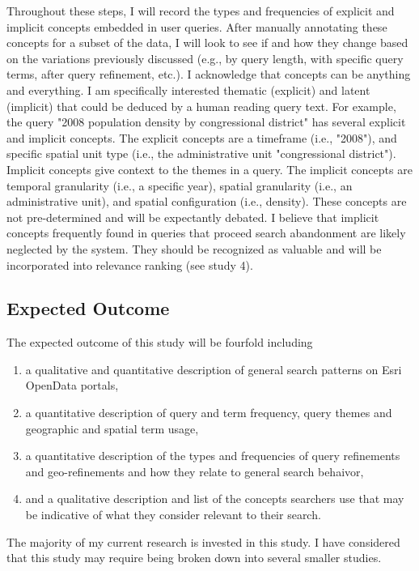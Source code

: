 Throughout these steps, I will record the types and frequencies of explicit and implicit concepts embedded in user queries. After manually annotating these concepts for a subset of the data, I will look to see if and how they change based on the variations previously discussed (e.g., by query length, with specific query terms, after query refinement, etc.). I acknowledge that concepts can be anything and everything. I am specifically interested thematic (explicit) and latent (implicit) that could be deduced by a human reading query text. For example, the query "2008 population density by congressional district" has several explicit and implicit concepts. The explicit concepts are a timeframe (i.e., "2008"), and specific spatial unit type (i.e., the administrative unit "congressional district"). Implicit concepts give context to the themes in a query. The implicit concepts are temporal granularity (i.e., a specific year), spatial granularity (i.e., an administrative unit), and spatial configuration (i.e., density). These concepts are not pre-determined and will be expectantly debated. I believe that implicit concepts frequently found in queries that proceed search abandonment are likely neglected by the system. They should be recognized as valuable and will be incorporated into relevance ranking (see study 4).

\subsection{Expected Outcome}
The expected outcome of this study will be fourfold including 
\begin{enumerate}
    \item a qualitative and quantitative description of general search patterns on Esri OpenData portals,
    \item a quantitative description of query and term frequency, query themes and geographic and spatial term usage,
    \item a quantitative description of the types and frequencies of query refinements and geo-refinements and how they relate to general search behaivor,
    \item and a qualitative description and list of the concepts searchers use that may be indicative of what they consider relevant to their search.
\end{enumerate}

The majority of my current research is invested in this study. I have considered that this study may require being broken down into several smaller studies.


